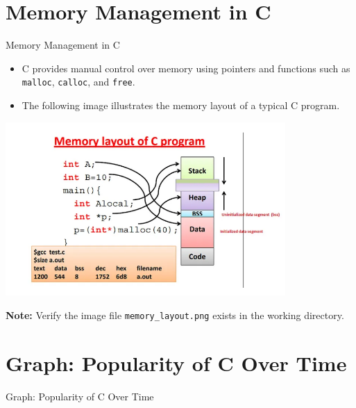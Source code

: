 \documentclass{beamer}
\begin{document}
\section{Memory Management in C}
\begin{frame}{Memory Management in C}
    \begin{itemize}
        \item C provides manual control over memory using pointers and functions such as \texttt{malloc}, \texttt{calloc}, and \texttt{free}.
        \item The following image illustrates the memory layout of a typical C program.
    \end{itemize}
    \begin{center}
        \includegraphics[width=0.8\textwidth]{memory_layout.png} %
    \end{center}
    \pause
    \textbf{Note:} Verify the image file \texttt{memory\_layout.png} exists in the working directory.
\end{frame}

\section{Graph: Popularity of C Over Time}
\begin{frame}{Graph: Popularity of C Over Time}
    \begin{center}
    \end{center}
    \caption{Popularity of C Language Over Time}
\end{frame}
\end{document}
